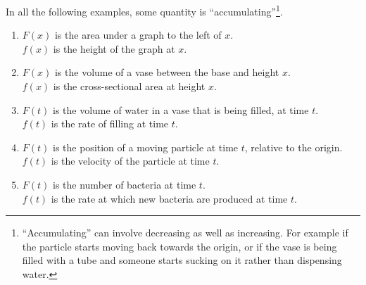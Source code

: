 \documentclass[12pt]{article}
\begin{document}
In all the following examples, some quantity is
``accumulating''\footnote{``Accumulating'' can involve decreasing as well as
  increasing. For example if the particle starts moving back towards the
  origin, or if the vase is being filled with a tube and someone starts sucking
  on it rather than dispensing water.}.

\begin{enumerate}
\item $F(x)$ is the area under a graph to the left of $x$.\\
      $f(x)$ is the height of the graph at $x$.\\

\item $F(x)$ is the volume of a vase between the base and height $x$. \\
      $f(x)$ is the cross-sectional area at height $x$.\\

\item $F(t)$ is the volume of water in a vase that is being filled, at time $t$.\\
      $f(t)$ is the rate of filling at time $t$.\\

\item $F(t)$ is the position of a moving particle at time $t$, relative to the origin.\\
      $f(t)$ is the velocity of the particle at time $t$.\\

\item $F(t)$ is the number of bacteria at time $t$.\\
      $f(t)$ is the rate at which new bacteria are produced at time $t$.
\end{enumerate}
\end{document}

